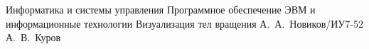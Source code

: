 \documentclass{bmstu}
\begin{document}
\makecourseworktitle
    {Информатика и системы управления}
    {Программное обеспечение ЭВМ и информационные технологии}
    {Визуализация тел вращения}
    {А.~А.~Новиков/ИУ7-52}
    {А.~В.~Куров}
    {}
    {}
    {}



\maketableofcontents









\makebibliography

\end{document}
